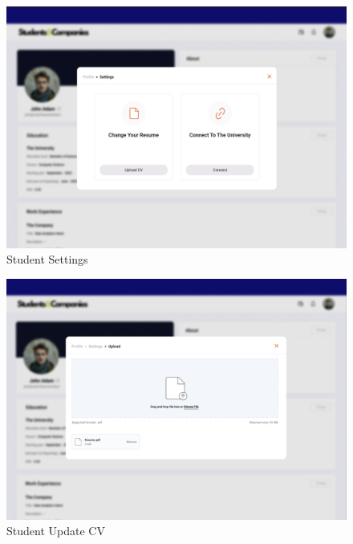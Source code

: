 \documentclass{article}
\begin{document}
\begin{figure}[H]
    \centering
    \includegraphics[scale = 0.42]{figures/UserInterfaces/Student/Settings.png}
    \caption{Student Settings}
     \centering
\end{figure}
\begin{figure}[H]
    \centering
    \includegraphics[scale = 0.42]{figures/UserInterfaces/Student/UploadCv.png}
    \caption{Student Update CV}
     \centering
\end{figure}
\end{document}
